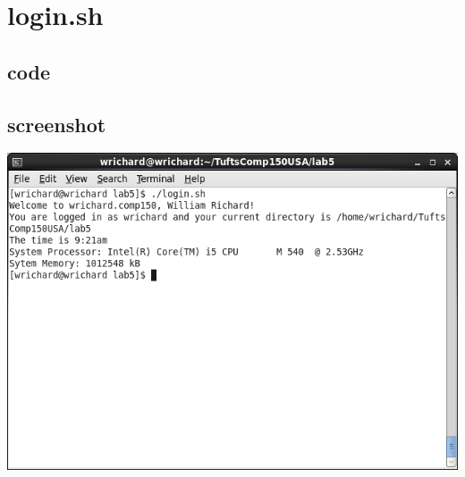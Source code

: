 \documentclass[a4paper,10pt]{article}
\begin{document}
\section{login.sh}
\subsection{code}

\subsection{screenshot}
  \begin{center}
  \includegraphics[width=\linewidth]{./login.png}
  \end{center}
\end{document}
